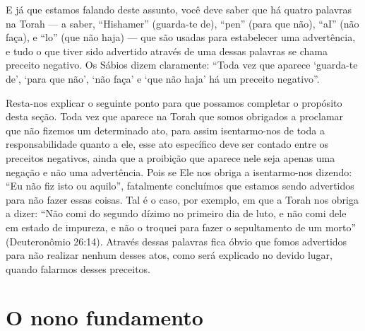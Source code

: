 E já que estamos falando deste assunto, você deve saber que há quatro
palavras na Torah --- a saber, ``Hishamer'' (guarda-te de), ``pen''
(para que não), ``aI'' (não faça), e ``lo'' (que não haja) --- que são
usadas para estabelecer uma advertência, e tudo o que tiver sido
advertido através de uma dessas palavras se chama preceito negativo. Os
Sábios dizem claramente: ``Toda vez que aparece `guarda-te de', `para
que não', `não faça' e `que não haja' há um preceito negativo''.

Resta-nos explicar o seguinte ponto para que possamos completar o
propósito desta seção. Toda vez que aparece na Torah que somos obrigados
a proclamar que não fizemos um determinado ato, para assim isentarmo-nos
de toda a responsabilidade quanto a ele, esse ato específico deve ser
contado entre os preceitos negativos, ainda que a proibição que aparece
nele seja apenas uma negação e não uma advertência. Pois se Ele nos
obriga a isentarmo-nos dizendo: ``Eu não fiz isto ou aquilo'',
fatalmente concluímos que estamos sendo advertidos para não fazer essas
coisas. Tal é o caso, por exemplo, em que a Torah nos obriga a dizer:
``Não comi do segundo dízimo no primeiro dia de luto, e não comi dele em
estado de impureza, e não o troquei para fazer o sepultamento de um
morto'' (Deuteronômio 26:14). Através dessas palavras fica óbvio que
fomos advertidos para não realizar nenhum desses atos, como será
explicado no devido lugar, quando falarmos desses preceitos.

\chapter*{O nono fundamento}

